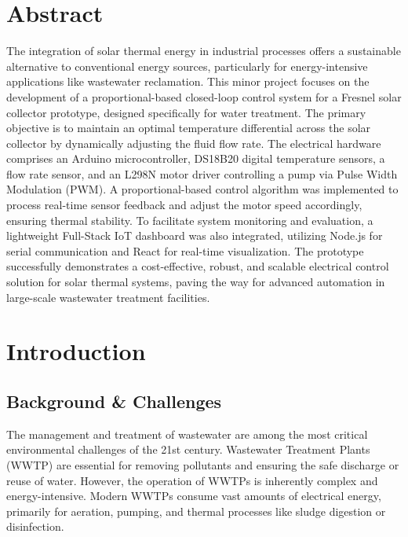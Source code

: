 \documentclass[12pt,a4paper]{report}
\begin{document}
\chapter*{Abstract}
The integration of solar thermal energy in industrial processes offers a sustainable alternative to conventional energy sources, particularly for energy-intensive applications like wastewater reclamation. This minor project focuses on the development of a proportional-based closed-loop control system for a Fresnel solar collector prototype, designed specifically for water treatment. The primary objective is to maintain an optimal temperature differential across the solar collector by dynamically adjusting the fluid flow rate. The electrical hardware comprises an Arduino microcontroller, DS18B20 digital temperature sensors, a flow rate sensor, and an L298N motor driver controlling a pump via Pulse Width Modulation (PWM). A proportional-based control algorithm was implemented to process real-time sensor feedback and adjust the motor speed accordingly, ensuring thermal stability. To facilitate system monitoring and evaluation, a lightweight Full-Stack IoT dashboard was also integrated, utilizing Node.js for serial communication and React for real-time visualization. The prototype successfully demonstrates a cost-effective, robust, and scalable electrical control solution for solar thermal systems, paving the way for advanced automation in large-scale wastewater treatment facilities.

\tableofcontents
\newpage

\listoffigures
\newpage

\chapter{Introduction}

\section{Background \& Challenges}
The management and treatment of wastewater are among the most critical environmental challenges of the 21st century. Wastewater Treatment Plants (WWTP) are essential for removing pollutants and ensuring the safe discharge or reuse of water. However, the operation of WWTPs is inherently complex and energy-intensive. Modern WWTPs consume vast amounts of electrical energy, primarily for aeration, pumping, and thermal processes like sludge digestion or disinfection.
\end{document}
